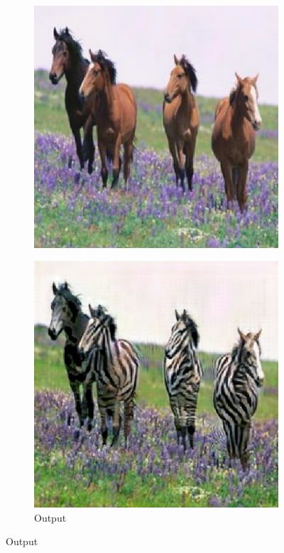 \begin{figure}
\begin{subfigure}[t]{.2\textwidth}
    \includegraphics[width=\linewidth]{images/cycleGanResults/horse_input1.png}
  \end{subfigure}
  \begin{subfigure}[t]{.2\textwidth}
    \caption{Output}
    \centering
    \includegraphics[width=\linewidth]{images/cycleGanResults/horse_output1.png}
  \end{subfigure}


\end{figure}
